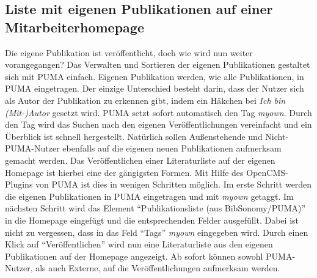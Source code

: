 \subsection{Liste mit eigenen Publikationen auf einer Mitarbeiterhomepage}
Die eigene Publikation ist veröffentlicht, doch wie wird nun weiter vorangegangen? \newline Das Verwalten und Sortieren der eigenen Publikationen gestaltet sich mit PUMA einfach. Eigenen  Publikation werden, wie alle Publikationen, in PUMA eingetragen. Der einzige Unterschied besteht darin, dass der Nutzer sich als Autor der Publikation zu erkennen gibt, indem ein Häkchen bei \textit{Ich bin (Mit-)Autor} gesetzt wird. PUMA setzt sofort automatisch den Tag \textit{myown}. Durch den Tag wird das Suchen nach den eigenen Veröffentlichungen vereinfacht und ein Überblick ist schnell hergestellt.\newline
Natürlich sollen Außenstehende und Nicht-PUMA-Nutzer ebenfalls auf die eigenen neuen Publikationen aufmerksam gemacht werden. Das Veröffentlichen einer Literaturliste auf der eigenen Homepage ist hierbei eine der gängigsten Formen. Mit Hilfe des OpenCMS-Plugins von PUMA ist dies in wenigen Schritten möglich. Im erste Schritt werden die eigenen Publikationen in PUMA eingetragen und mit \textit{myown} getaggt. Im nächsten Schritt wird das Element \enquote{Publikationsliste (aus BibSonomy/PUMA)} in die Homepage eingefügt und die  entsprechenden Felder ausgefüllt. Dabei ist nicht zu vergessen, dass in das Feld \enquote{Tags} \textit{myown} eingegeben wird. Durch einen Klick auf \enquote{Veröffentlichen} wird nun eine Literaturliste aus den eigenen Publikationen auf der Homepage angezeigt.  
Ab sofort können sowohl PUMA-Nutzer, als auch Externe, auf die Veröffentlichungen aufmerksam werden.


